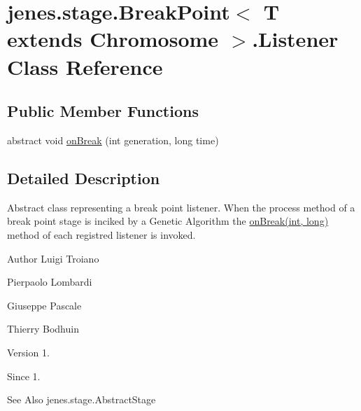 \hypertarget{classjenes_1_1stage_1_1_break_point_3_01_t_01extends_01_chromosome_01_4_1_1_listener}{\section{jenes.\-stage.\-Break\-Point$<$ T extends Chromosome $>$.Listener Class Reference}
\label{classjenes_1_1stage_1_1_break_point_3_01_t_01extends_01_chromosome_01_4_1_1_listener}
}
\subsection*{Public Member Functions}
\begin{DoxyCompactItemize}
\item 
abstract void \hyperlink{classjenes_1_1stage_1_1_break_point_3_01_t_01extends_01_chromosome_01_4_1_1_listener_a34cacdf431e970d8c40cd433a50b5fc0}{on\-Break} (int generation, long time)
\end{DoxyCompactItemize}


\subsection{Detailed Description}
Abstract class representing a break point listener. When the process method of a break point stage is inciked by a Genetic Algorithm the \hyperlink{classjenes_1_1stage_1_1_break_point_3_01_t_01extends_01_chromosome_01_4_1_1_listener_a34cacdf431e970d8c40cd433a50b5fc0}{on\-Break(int, long)} method of each registred listener is invoked.

\begin{DoxyAuthor}{Author}
Luigi Troiano 

Pierpaolo Lombardi 

Giuseppe Pascale 

Thierry Bodhuin
\end{DoxyAuthor}
\begin{DoxyVersion}{Version}
1.
\end{DoxyVersion}
\begin{DoxySince}{Since}
1.
\end{DoxySince}
\begin{DoxySeeAlso}{See Also}
jenes.\-stage.\-Abstract\-Stage 
\end{DoxySeeAlso}


